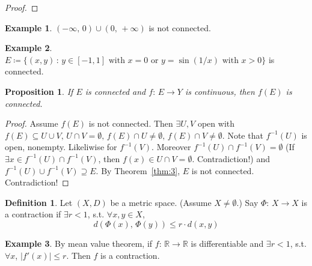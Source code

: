 \documentclass[12pt]{article}
\theoremstyle{plain}
\newtheorem*{prop}{Proposition}
\theoremstyle{definition}
\newtheorem*{defn}{Definition}
\newtheorem*{eg}{Example}
\begin{document}
\begin{proof}
\end{proof}

\begin{eg}
    $(-\infty,\,0)\cup(0,\,+\infty)$ is not connected.
\end{eg}

\begin{eg}
    $E\coloneqq\{(x,y)\,:\,y\in[-1,1]x=0y=\sin(1/x)x>0\}$ is connected.
\end{eg}

\begin{prop}
    If $E$ is connected and $f:\,E\rightarrow Y$ is continuous,
    then $f(E)$ is connected.
\end{prop}
\begin{proof}
    Assume $f(E)$ is not connected.
    Then $\exists U,V$ open with $f(E)\subseteq U\cup V,\,U\cap
    V=\emptyset,\,f(E)\cap U\neq\emptyset,\,f(E)\cap V\neq\emptyset$.
    Note that $f^{-1}(U)$ is open, nonempty.
    Likeliwise for $f^{-1}(V)$.
    Moreover $f^{-1}(U)\cap f^{-1}(V)=\emptyset$ (If $\exists x\in f^{-1}(U)\cap
    f^{-1}(V)$, then $f(x)\in U\cap V=\emptyset$. Contradiction!)
    and $f^{-1}(U)\cup f^{-1}(V)\supseteq E$.
    By Theorem~\ref{thm:3}, $E$ is not connected.
    Contradiction!
\end{proof}

\begin{defn}
    Let $(X,D)$ be a metric space. (Assume $X\neq\emptyset$.)
    Say $\Phi:\,X\rightarrow X$ is a contraction if $\exists r<1$, s.t.
    $\forall x,y\in X$, $$d(\Phi(x),\,\Phi(y))\leq r\cdot d(x,y)$$
\end{defn}

\begin{eg}
    By mean value theorem, if $f:\,\rightarrow {}$ is
    differentiable and $\exists r<1$, s.t. $\forall x$, $|f'(x)|\leq r$.
    Then $f$ is a contraction.
\end{eg}
\end{document}

